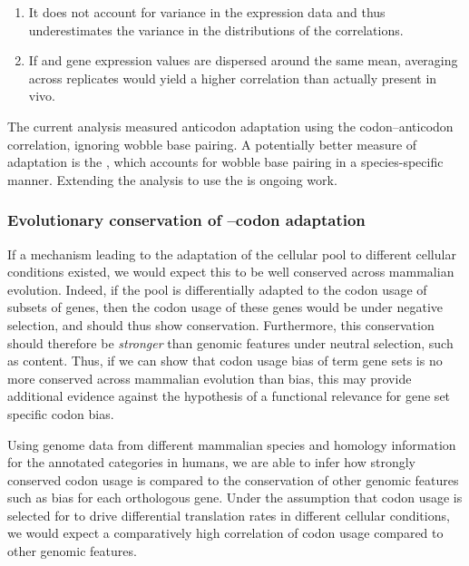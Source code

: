 \begin{enumerate}
    \item It does not account for variance in the expression data and thus
        underestimates the variance in the distributions of the correlations.
    \item If \mrna and \trna gene expression values are dispersed around the
        same mean, averaging across replicates would yield a higher correlation
        than actually present in vivo.
\end{enumerate}

The current analysis measured \trna anticodon adaptation using the
codon--anticodon correlation, ignoring wobble base pairing. A potentially better
measure of \trna adaptation is the \tai, which accounts for wobble base pairing
in a species-specific manner. Extending the analysis to use the \tai is ongoing
work.

\subsubsection{Evolutionary conservation of --codon adaptation}

If a mechanism leading to the adaptation of the cellular \trna pool to different
cellular conditions existed, we would expect this to be well conserved across
mammalian evolution. Indeed, if the \trna pool is differentially adapted to the
codon usage of subsets of genes, then the codon usage of these genes would be
under negative selection, and should thus show conservation. Furthermore, this
conservation should therefore be \emph{stronger} than genomic features under
neutral selection, such as \gc content. Thus, if we can show that codon usage
bias of \go term gene sets is no more conserved across mammalian evolution than
\gc bias, this may provide additional evidence against the hypothesis of a
functional relevance for gene set specific codon bias.

Using genome data from different mammalian species and homology information for
the annotated \go categories in humans, we are able to infer how strongly
conserved codon usage is compared to the conservation of other genomic features
such as \gc bias for each orthologous gene. Under the assumption that codon
usage is selected for to drive differential translation rates in different
cellular conditions, we would expect a comparatively high correlation of codon
usage compared to other genomic features.
